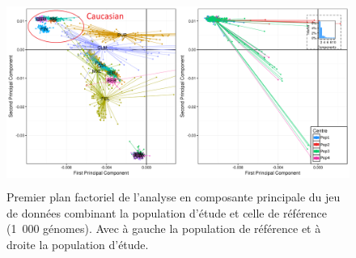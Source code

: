 \documentclass[11pt,a4paper,notrimn]{krantz}
\theoremstyle{definition}
\theoremstyle{definition}
\theoremstyle{remark}
\begin{document}
\begin{figure}[!htb]

{\centering \includegraphics[width=6in,height=2.4in]{FiguresTables/population} 

}

\caption{Premier plan factoriel de l'analyse en composante
principale du jeu de données combinant la population d'étude et celle de
référence (1~000 génomes). Avec à gauche la population de référence et à
droite la population d'étude.}\label{fig:population}
\end{figure}
\end{document}
